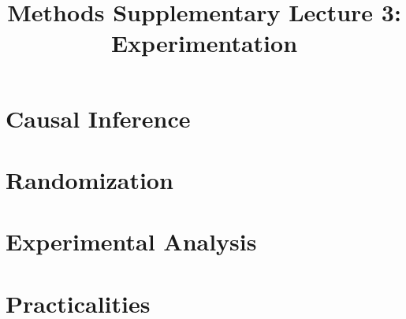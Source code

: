 
\usepackage{tikz}
\usetikzlibrary{shapes,arrows}

\title{Methods Supplementary Lecture 3:\\Experimentation}

\date[]{}



\frame{\titlepage}

\frame{\tableofcontents}

\section{Causal Inference}
\frame{\tableofcontents[currentsection]}

\frame{\frametitle{}}


\section{Randomization}
\frame{\tableofcontents[currentsection]}

\frame{\frametitle{}}


\section{Experimental Analysis}
\frame{\tableofcontents[currentsection]}

\frame{\frametitle{}}


\section{Practicalities}
\frame{\tableofcontents[currentsection]}

\frame{\frametitle{}}




\appendix
\frame{}


